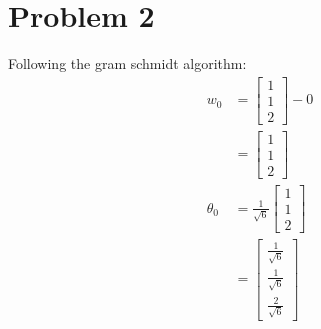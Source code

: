\documentclass{article}
\begin{document}
\section*{Problem 2}
Following the gram schmidt algorithm: \\
\begin{align*}
w_{0} &= \begin{bmatrix}1 \\ 1 \\ 2 \end{bmatrix} - 0 \\
&= \begin{bmatrix}1 \\ 1 \\ 2 \end{bmatrix} \\
\theta_{0} &= \frac{1}{\sqrt{6}}  \begin{bmatrix}1 \\ 1 \\ 2 \end{bmatrix} \\
&= \begin{bmatrix}\frac{1}{\sqrt{6}} \\ \frac{1}{\sqrt{6}} \\ \frac{2}{\sqrt{6}} \end{bmatrix}
\end{align*}
\end{document}
